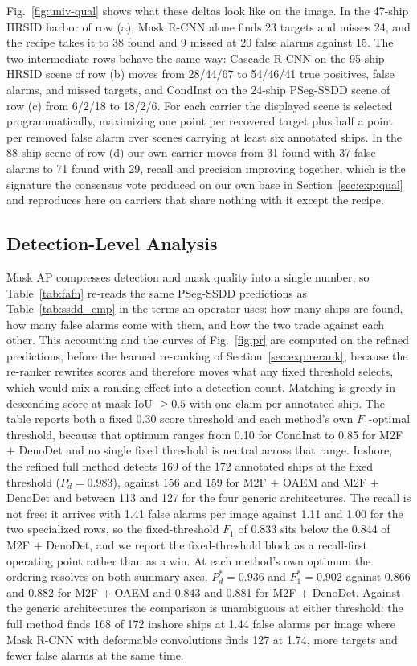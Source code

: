 Fig.~\ref{fig:univ-qual} shows what these deltas look like on the image. In the 47-ship HRSID harbor of row (a), Mask R-CNN alone finds 23 targets and misses 24, and the recipe takes it to 38 found and 9 missed at 20 false alarms against 15. The two intermediate rows behave the same way: Cascade R-CNN on the 95-ship HRSID scene of row (b) moves from 28/44/67 to 54/46/41 true positives, false alarms, and missed targets, and CondInst on the 24-ship PSeg-SSDD scene of row (c) from 6/2/18 to 18/2/6. For each carrier the displayed scene is selected programmatically, maximizing one point per recovered target plus half a point per removed false alarm over scenes carrying at least six annotated ships. In the 88-ship scene of row (d) our own carrier moves from 31 found with 37 false alarms to 71 found with 29, recall and precision improving together, which is the signature the consensus vote produced on our own base in Section~\ref{sec:exp:qual} and reproduces here on carriers that share nothing with it except the recipe.

\subsection{Detection-Level Analysis}\label{sec:exp:detect}

Mask AP compresses detection and mask quality into a single number, so Table~\ref{tab:fafn} re-reads the same PSeg-SSDD predictions as Table~\ref{tab:ssdd_cmp} in the terms an operator uses: how many ships are found, how many false alarms come with them, and how the two trade against each other. This accounting and the curves of Fig.~\ref{fig:pr} are computed on the refined predictions, before the learned re-ranking of Section~\ref{sec:exp:rerank}, because the re-ranker rewrites scores and therefore moves what any fixed threshold selects, which would mix a ranking effect into a detection count. Matching is greedy in descending score at mask IoU $\ge 0.5$ with one claim per annotated ship. The table reports both a fixed 0.30 score threshold and each method's own $F_1$-optimal threshold, because that optimum ranges from 0.10 for CondInst to 0.85 for M2F $+$ DenoDet and no single fixed threshold is neutral across that range. Inshore, the refined full method detects 169 of the 172 annotated ships at the fixed threshold ($P_d=0.983$), against 156 and 159 for M2F $+$ OAEM and M2F $+$ DenoDet and between 113 and 127 for the four generic architectures. The recall is not free: it arrives with 1.41 false alarms per image against 1.11 and 1.00 for the two specialized rows, so the fixed-threshold $F_1$ of 0.833 sits below the 0.844 of M2F $+$ DenoDet, and we report the fixed-threshold block as a recall-first operating point rather than as a win. At each method's own optimum the ordering resolves on both summary axes, $P_d^{*}=0.936$ and $F_1^{*}=0.902$ against 0.866 and 0.882 for M2F $+$ OAEM and 0.843 and 0.881 for M2F $+$ DenoDet. Against the generic architectures the comparison is unambiguous at either threshold: the full method finds 168 of 172 inshore ships at 1.44 false alarms per image where Mask R-CNN with deformable convolutions finds 127 at 1.74, more targets and fewer false alarms at the same time.

